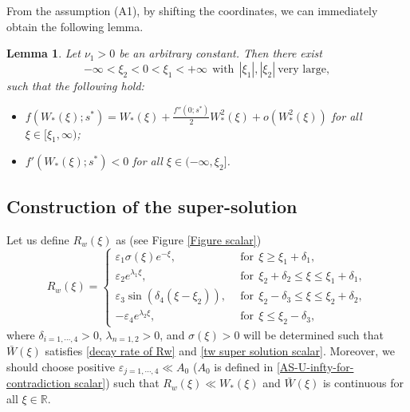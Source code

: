 \documentclass[11pt,a4paper]{article}
\newtheorem{lemma}[theorem]{\textbf{Lemma}}
\numberwithin{equation}{section}
\numberwithin{figure}{section}
\newcommand\dps{\displaystyle}
\newcommand{\red}[1]{{\color{red}#1}}
\newcommand\bea{\begin{eqnarray}}
\newcommand\eea{\end{eqnarray}}
\begin{document}


From the assumption (A1), by shifting the coordinates, we can immediately obtain
the following lemma.

\begin{lemma}\label{lm: divide R to 3 parts}
Let $\nu_{1}>0$ be %
an arbitrary constant. Then there exist
$$-\infty<\xi_2<0<\xi_1<+\infty\ \ \text{with}\ \ |\xi_1|,|\xi_2|\ \text{very large},$$
such that
the following hold:
\begin{itemize}
    \item[(1)]
    $\dps f(W_{*}(\xi);s^*)=W_{*}(\xi)+\frac{f''(0;s^*)}{2}W^2_{*}(\xi)+o(W^2_{*}(\xi))$ for all $\xi\in[\xi_1,\infty)$;
    \item[(2)]  $f'(W_{*}(\xi);s^*)<0$ for all $\xi\in(-\infty,\xi_2]$.
\end{itemize}
\end{lemma}


\subsection{Construction of the super-solution}\label{subsec-2-1}

\noindent

Let us define $R_w(\xi)$ as (see Figure \ref{Figure scalar})
\begin{equation}\label{definition of Rw}
R_w(\xi)=\begin{cases}
\varepsilon_1\sigma(\xi) e^{-\xi},&\ \ \mbox{for}\ \ \xi\ge\xi_{1}+\delta_1,\\
\varepsilon_2 e^{\lambda_1\xi},&\ \ \mbox{for}\ \ \xi_{2}+\delta_2\le\xi\le\xi_{1}+\delta_1,\\
\varepsilon_3\sin(\delta_4(\xi-\xi_2)),&\ \ \mbox{for}\ \ \xi_2-\delta_3\le\xi\le\xi_2+\delta_2,\\
-\varepsilon_4e^{\lambda_2\xi},&\ \ \mbox{for}\ \ \xi\le\xi_2-\delta_3,
\end{cases}
\end{equation}
where $\delta_{i=1,\cdots,4}>0$, $\lambda_{n=1,2}>0$, and $\sigma(\xi)>0$ will be
determined such that $\bar W(\xi)$ satisfies \eqref{decay rate of Rw} and \eqref{tw super solution scalar}. Moreover, we should choose
positive $\varepsilon_{j=1,\cdots,4}\ll A_0$ ($A_0$ is defined in \eqref{AS-U-infty-for-contradiction scalar}) such that $R_w(\xi)\ll W_*(\xi)$ and $\bar W(\xi)$ is continuous for all $\xi\in\mathbb{R}$.
\end{document}

